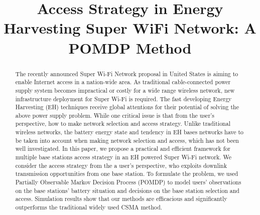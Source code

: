 \documentclass[conference]{IEEEtran}
\begin{document}
\title{Access Strategy in Energy Harvesting Super WiFi Network: A POMDP Method}

\author{
	\small{}}
\maketitle

\begin{abstract}
The recently announced Super Wi-Fi Network proposal in United States is aiming to enable Internet access in a nation-wide area.
As traditional cable-connected power supply system becomes impractical or costly for a wide range wireless network,
new infrastructure deployment for Super Wi-Fi is required.
The fast developing Energy Harvesting (EH) techniques receive global
attentions for their potential of solving the above power supply problem.
While one critical issue is that from the user's perspective, how to make network selection and access strategy. Unlike traditional wireless networks, the battery energy state and tendency in EH bases networks have to be taken into account when making network selection and access, which has not been well investigated.
In this paper, we propose a practical and efficient framework for multiple base stations access strategy in an EH powered Super Wi-Fi network.
We consider the access strategy from the a user's perspective,
who exploits downlink transmission opportunities from one base station.
To formulate the problem, we used Partially Observable Markov Decision Process (POMDP) to model users' observations on the base stations' battery situation and decisions on the base station selection and access. Simulation results show that our methods are efficacious and significantly outperforms
the traditional widely used CSMA method.
\end{abstract}
\IEEEpeerreviewmaketitle
\end{document}
